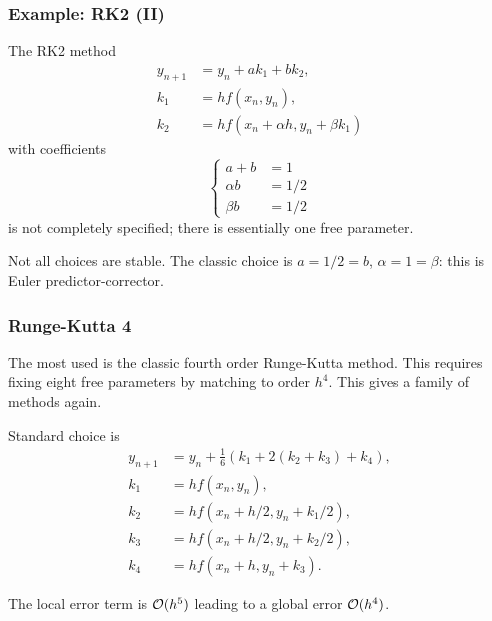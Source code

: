 \documentclass{beamer}
\begin{document}
\begin{frame}
  \frametitle{Example: RK2 (II)}

  The RK2 method
  \begin{align*}
    y_{n+1} & = y_n + a k_1 + b k_2, \\
    k_1 & = h f(x_n, y_n), \\
    k_2 & = h f(x_n + \alpha h, y_n + \beta k_1)
  \end{align*}
  with coefficients
  \begin{equation*}
    \left\{
      \begin{aligned}
        a + b & = 1 \\
        \alpha b & = 1 / 2 \\
        \beta b & = 1 / 2
      \end{aligned}
    \right.
  \end{equation*}
  is not completely specified; there is essentially one free
  parameter. \pause

  \vspace{1ex}

  Not all choices are stable. The classic choice is $a = 1/2 = b$,
  $\alpha = 1 = \beta$: this is Euler predictor-corrector.

\end{frame}

\begin{frame}
  \frametitle{Runge-Kutta 4}

  The most used is the classic fourth order Runge-Kutta method. This
  requires fixing eight free parameters by matching to order
  $h^4$. This gives a family of methods again. \pause

  \vspace{1ex}

  Standard choice is
  \begin{align*}
    y_{n+1} & = y_n + \tfrac{1}{6} \left( k_1 + 2 (k_2 + k_3) + k_4
    \right), \\
    k_1 & = h f(x_n, y_n), \\
    k_2 & = h f(x_n + h / 2, y_n + k_1 / 2), \\
    k_3 & = h f(x_n + h / 2, y_n + k_2 / 2), \\
    k_4 & = h f(x_n + h    , y_n + k_3    ).
  \end{align*} \pause

  \vspace{1ex}

  The local error term is ${\cal O}(h^5)$ leading to a global error
  ${\cal O}(h^4)$.

\end{frame}
\end{document}
